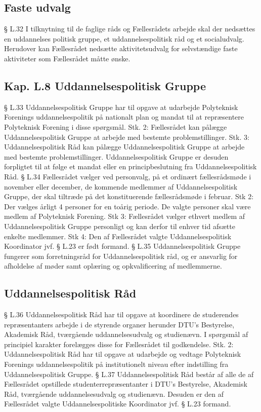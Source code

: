 \begin{list}
\subsection{Faste udvalg}
§ L.32
I tilknytning til de faglige råds og Fællesrådets arbejde skal der nedsættes en uddannelses politisk gruppe, et
uddannelsespolitisk råd og et socialudvalg. Herudover kan Fællesrådet nedsætte aktivitetsudvalg for
selvstændige faste aktiviteter som Fællesrådet måtte ønske.
\subsection{Kap. L.8 Uddannelsespolitisk Gruppe}
§ L.33
Uddannelsespolitisk Gruppe har til opgave at udarbejde Polyteknisk Forenings uddannelsespolitik på
nationalt plan og mandat til at repræsentere Polyteknisk Forening i disse spørgsmål.
Stk. 2: Fællesrådet kan pålægge Uddannelsespolitisk Gruppe at arbejde med bestemte problemstillinger.
Stk. 3: Uddannelsespolitisk Råd kan pålægge Uddannelsespolitisk Gruppe at arbejde med bestemte
problemstillinger. Uddannelsespolitisk Gruppe er desuden forpligtet til at følge et mandat eller en
principbeslutning fra Uddannelsespolitisk Råd.
§ L.34
Fællesrådet vælger ved personvalg, på et ordinært fællesrådsmøde i november eller december, de kommende
medlemmer af Uddannelsespolitisk Gruppe, der skal tiltræde på det konstituerende fællesrådsmøde i februar.
Stk 2: Der vælges årligt 4 personer for en toårig periode. De valgte personer skal være medlem af
Polyteknisk Forening.
Stk 3: Fællesrådet vælger ethvert medlem af Uddannelsespolitisk Gruppe personligt og kan derfor til enhver
tid afsætte enkelte medlemmer.
Stk 4: Den af Fællesrådet valgte Uddannelsespolitisk Koordinator jvf. § L.23 er født formand.
§ L.35
Uddannelsespolitisk Gruppe fungerer som forretningsråd for Uddannelsespolitisk råd, og er ansvarlig for
afholdelse af møder samt oplæring og opkvalificering af medlemmerne.
\subsection{Uddannelsespolitisk Råd}
§ L.36
Uddannelsespolitisk Råd har til opgave at koordinere de studerendes repræsentanters arbejde i de styrende
organer herunder DTU’s Bestyrelse, Akademisk Råd, tværgående uddannelsesudvalg og studienævn. I
spørgsmål af principiel karakter forelægges disse for Fællesrådet til godkendelse.
Stk. 2: Uddannelsespolitisk Råd har til opgave at udarbejde og vedtage Polyteknisk Forenings
uddannelsespolitik på institutionelt niveau efter indstilling fra Uddannelsespolitisk Gruppe.
§ L.37
Uddannelsespolitisk Råd består af alle de af Fællesrådet opstillede studenterrepræsentanter i DTU’s
Bestyrelse, Akademisk Råd, tværgående uddannelsesudvalg og studienævn. Desuden er den af Fællesrådet
valgte Uddannelsespolitiske Koordinator jvf. § L.23 formand.

\end{list}
